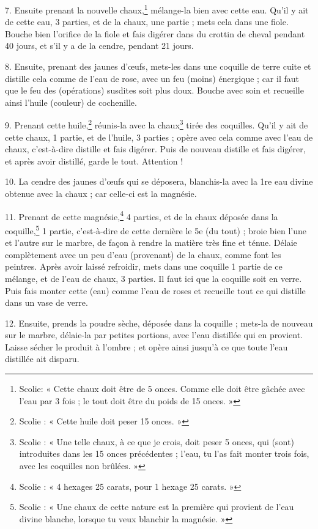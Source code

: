 \documentclass[a4paper, 11pt, oneside, polutonikogreek, french]{article}
\begin{document}
7. Ensuite prenant la nouvelle chaux,\footnote{Scolie: « Cette chaux doit être de 5 onces. Comme elle doit être gâchée avec l'eau par 3 fois ; le tout doit être du poids de 15 onces. »} mélange-la bien avec cette eau. Qu'il y ait de cette eau, 3 parties, et de la chaux, une partie ; mets cela dans une fiole. Bouche bien l'orifice de la fiole et fais digérer dans du crottin de cheval pendant 40 jours, et s'il y a de la cendre, pendant 21 jours.

8. Ensuite, prenant des jaunes d'œufs, mets-les dans une coquille de terre cuite et distille cela comme de l'eau de rose, avec un feu (moins) énergique ; car il faut que le feu des (opérations) susdites soit plus doux. Bouche avec soin et recueille ainsi l'huile (couleur) de cochenille.

9. Prenant cette huile,\footnote{Scolie : « Cette huile doit peser 15 onces. »} réunis-la avec la chaux\footnote{Scolie : « Une telle chaux, à ce que je crois, doit peser 5 onces, qui (sont) introduites dans les 15 onces précédentes ; l'eau, tu l'as fait monter trois fois, avec les coquilles non brûlées. »} tirée des coquilles. Qu'il y ait de cette chaux, 1 partie, et de l'huile, 3 parties ; opère avec cela comme avec l'eau de chaux, c'est-à-dire distille et fais digérer. Puis de nouveau distille et fais digérer, et après avoir distillé, garde le tout. Attention !

10. La cendre des jaunes d'œufs qui se déposera, blanchis-la avec la 1re eau divine obtenue avec la chaux ; car celle-ci est la magnésie.

11. Prenant de cette magnésie,\footnote{Scolie : « 4 hexages 25 carats, pour 1 hexage 25 carats. »} 4 parties, et de la chaux déposée dans la coquille,\footnote{Scolie : « Une chaux de cette nature est la première qui provient de l'eau divine blanche, lorsque tu veux blanchir la magnésie. »} 1 partie, c'est-à-dire de cette dernière le 5e (du tout) ; broie bien l'une et l'autre sur le marbre, de façon à rendre la matière très fine et ténue. Délaie complètement avec un peu d'eau (provenant) de la chaux, comme font les peintres. Après avoir laissé refroidir, mets dans une coquille 1 partie de ce mélange, et de l'eau de chaux, 3 parties. Il faut ici que la coquille soit en verre. Puis fais monter cette (eau) comme l'eau de roses et recueille tout ce qui distille dans un vase de verre.

12. Ensuite, prends la poudre sèche, déposée dans la coquille ; mets-la de nouveau sur le marbre, délaie-la par petites portions, avec l'eau distillée qui en provient. Laisse sécher le produit à l'ombre ; et opère ainsi jusqu'à ce que toute l'eau distillée ait disparu.
\end{document}

